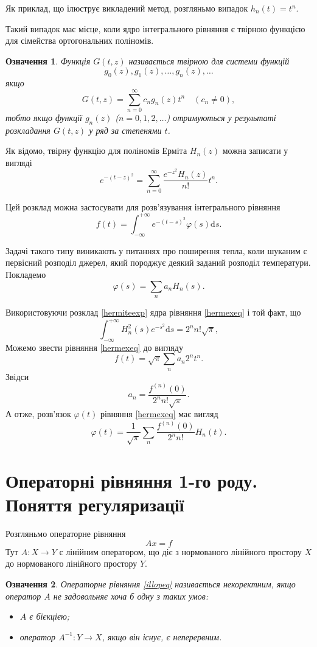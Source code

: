\documentclass[14pt,twoside]{extreport}
\theoremstyle{mystyle}
\newtheorem{dfn}{Означення}
\numberwithin{equation}{chapter}
\begin{document}
Як приклад, що ілюструє викладений метод, розгляньмо випадок $h_n(t) = t^n$.

Такий випадок має місце, коли ядро інтегрального рівняння є твірною функцією для сімейства ортогональних поліномів.

\begin{dfn}
Функція $G(t, z)$ називається твірною для системи функцій
\[
 g_0(z), g_1(z), \ldots, g_n(z), \ldots
\]
якщо
\[
 G(t, z) = \sum_{n=0}^{\infty} c_n g_n(z) t^n \quad (c_n \neq 0),
\]
тобто якщо функції $g_n(z)$ ($n = 0, 1, 2, \ldots$) отримуються у результаті розкладання $G(t, z)$ у ряд за степенями $t$.
\end{dfn}

Як відомо, твірну функцію для поліномів Ерміта $H_n(z)$ можна записати у вигляді
\begin{equation}\label{hermiteexp}
 e^{-(t-z)^2} = \sum_{n=0}^{\infty} \frac{e^{-z^2} H_n(z)}{n!} t^n.
\end{equation}

Цей розклад можна застосувати для розв'язування інтегрального рівняння
\begin{equation}\label{hermexeq}
 f(t) = \int_{-\infty}^{+\infty} e^{-(t-s)^2} \varphi(s) \mathrm{d}s.
\end{equation}

Задачі такого типу виникають у питаннях про поширення тепла, коли шуканим є первісний розподіл джерел, який породжує деякий заданий розподіл температури. Покладемо
\[
 \varphi(s) = \sum_n a_n H_n(s).
\]

Використовуючи розклад \eqref{hermiteexp} ядра рівняння \eqref{hermexeq} і той факт, що
\[
 \int_{-\infty}^{+\infty} H_n^2(s) e^{-s^2} \mathrm{d}s = 2^n n! \sqrt{\pi},
\]
Можемо звести рівняння \eqref{hermexeq} до вигляду
\[
 f(t) = \sqrt{\pi} \sum_n a_n 2^n t^n.
\]
Звідси
\[
 a_n = \frac{f^{(n)}(0)}{2^n n! \sqrt{\pi}}.
\]
А отже, розв'язок $\varphi(t)$ рівняння \eqref{hermexeq} має вигляд
\[
 \varphi(t) = \frac{1}{\sqrt{\pi}} \sum _n \frac{f^{(n)}(0)}{2^n n!} H_n(t).
\]


\section{Операторні рівняння 1-го роду. Поняття регуляризації}

Розгляньмо операторне рівняння
\begin{equation}\label{illopeq}
Ax=f
\end{equation}
Тут $A:X\to  Y$ є лінійним оператором, що діє з нормованого лінійного простору $X$ до нормованого лінійного простору $Y$.
\begin{dfn}
	Операторне рівняння \eqref{illopeq} називається некоректним, якщо оператор $A$ не задовольняє хоча б одну з таких умов:
	\begin{itemize}
		\item $A$ є бієкцією;
		\item оператор $A^{-1}: Y\to  X$, якщо він існує, є неперервним.
	\end{itemize}
\end{dfn}
\end{document}
